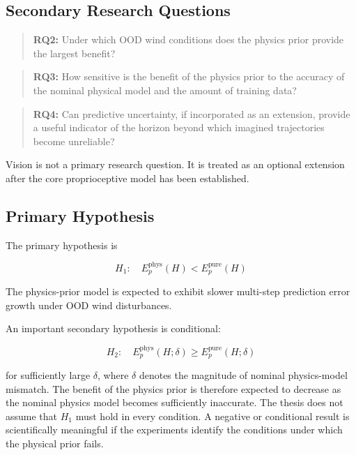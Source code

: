\documentclass[conference]{IEEEtran}
\begin{document}
\subsection{Secondary Research Questions}

\begin{quote}
\textbf{RQ2:}
Under which OOD wind conditions does the physics prior provide the
largest benefit?
\end{quote}

\begin{quote}
\textbf{RQ3:}
How sensitive is the benefit of the physics prior to the accuracy of
the nominal physical model and the amount of training data?
\end{quote}

\begin{quote}
\textbf{RQ4:}
Can predictive uncertainty, if incorporated as an extension, provide a
useful indicator of the horizon beyond which imagined trajectories
become unreliable?
\end{quote}

Vision is not a primary research question. It is treated as an optional
extension after the core proprioceptive model has been established.


\subsection{Primary Hypothesis}

The primary hypothesis is

\begin{equation}
\boxed{
H_1:\quad
E_p^{\mathrm{phys}}(H)
<
E_p^{\mathrm{pure}}(H)
}
\end{equation}

\noindent
The physics-prior model is expected to exhibit slower multi-step
prediction error growth under OOD wind disturbances.

An important secondary hypothesis is conditional:

\begin{equation}
\boxed{
H_2:\quad
E_p^{\mathrm{phys}}(H;\delta)
\geq
E_p^{\mathrm{pure}}(H;\delta)
}
\end{equation}

\noindent
for sufficiently large $\delta$, where $\delta$ denotes the magnitude
of nominal physics-model mismatch. The benefit of the physics prior is
therefore expected to decrease as the nominal physics model becomes
sufficiently inaccurate. The thesis does not assume that $H_1$ must hold in every condition.
A negative or conditional result is scientifically meaningful if the
experiments identify the conditions under which the physical prior
fails.
\end{document}
